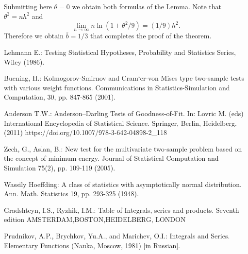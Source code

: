 \documentclass{svproc}
\begin{document}
Submitting here  $\theta=0$ we obtain both formulas of the Lemma.
Note that $\theta^2=nh^2$ and
$$
\lim_{n\to \infty} n \ln(1+ \theta^2/9)= (1/9)h^2.
$$
Therefore we obtain $\bar b = 1/3$ that completes the proof of the theorem.
\begin{thebibliography}{6}

Lehmann E.: Testing  Statistical  Hypotheses,  Probability  and  Statistics  Series,  Wiley (1986).

Buening, H.: Kolmogorov-Smirnov and Cram`er-von Mises type two-sample tests with various weight functions. Communications in Statistics-Simulation and Computation, 30, pp. 847-865 (2001).

Anderson T.W.:  Anderson–Darling Tests of Goodness-of-Fit. In: Lovric M. (eds) International Encyclopedia of Statistical Science. Springer, Berlin, Heidelberg.(2011) https://doi.org/10.1007/978-3-642-04898-2\_118

Zech, G., Aslan, B.: New test for the multivariate two-sample problem based on the concept of minimum energy. Journal of Statistical Computation and Simulation 75(2), pp. 109-119 (2005).

Wassily Hoeffding: A class of statistics with asymptotically normal distribution. Ann. Math. Statistics 19, pp. 293-325 (1948).

Gradshteyn, I.S., Ryzhik, I.M.: Table of Integrals, series and products. Seventh edition AMSTERDAM,BOSTON,HEIDELBERG, LONDON

Prudnikov, A.P., Brychkov, Yu.A., and Marichev, O.I.: Integrals and Series. Elementary Functions (Nauka, Moscow, 1981) [in Russian].

\end{thebibliography}
\end{document}
